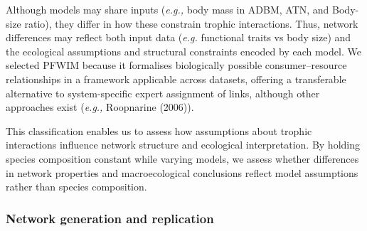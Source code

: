 \documentclass[
]{article}
\begin{document}
Although models may share inputs (\emph{e.g.,} body mass in ADBM, ATN,
and Body-size ratio), they differ in how these constrain trophic
interactions. Thus, network differences may reflect both input data
(\emph{e.g.} functional traits vs body size) and the ecological
assumptions and structural constraints encoded by each model. We
selected PFWIM because it formalises biologically possible
consumer--resource relationships in a framework applicable across
datasets, offering a transferable alternative to system-specific expert
assignment of links, although other approaches exist (\emph{e.g.,}
Roopnarine (2006)).

This classification enables us to assess how assumptions about trophic
interactions influence network structure and ecological interpretation.
By holding species composition constant while varying models, we assess
whether differences in network properties and macroecological
conclusions reflect model assumptions rather than species composition.

\subsubsection{Network generation and
replication}\label{network-generation-and-replication}
\end{document}
